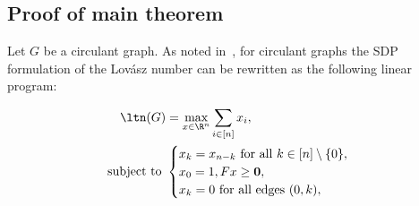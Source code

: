 
\subsection{Proof of main theorem}

Let $G$ be a circulant graph. As noted in~\cite{magsino2019linear}, for circulant graphs the SDP formulation of the Lovász number can be rewritten as the following linear program:

\begin{equation}
\begin{aligned}
    \ltn(G) &= \max_{x \in \R^{n}} \sum_{i \in [n]} x_i, \\ \text{ subject to }
    &\begin{cases} x_k = x_{n - k} \text{ for all } k \in [n] \setminus \{0\}, \\
    x_0 = 1,
    Fx \geq \mathbf{0}, \\
    x_k = 0\text{ for all edges } (0, k),
    \end{cases}
\end{aligned}
\end{equation}

